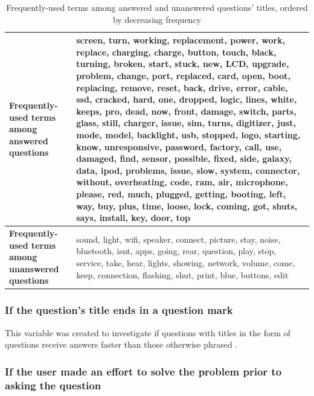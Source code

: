 \documentclass[preprint]{elsarticle}
\begin{document}
\begin{table}[!htbp]
\centering
\begin{tabular}{|L{4cm}|L{8cm}|}
  \hline
 \textbf{Frequently-used terms among answered questions} & screen, turn, working, replacement, power, work, replace, charging, charge, button, touch, black, turning, broken, start, stuck, new, LCD, upgrade, problem, change, port, replaced, card, open, boot, replacing, remove, reset, back, drive, error, cable, ssd, cracked, hard, one, dropped, logic, lines, white, keeps, pro, dead, now, front, damage, switch, parts, glass, still, charger, issue, sim, turns, digitizer, just, mode, model, backlight, usb, stopped, logo, starting, know, unresponsive, password, factory, call, use, damaged, find, sensor, possible, fixed, side, galaxy, data, ipod, problems, issue, slow, system, connector, without, overheating, code, ram, air, microphone, please, red, much, plugged, getting, booting, left, way, buy, plus, time, loose, lock, coming, got, shuts, says, install, key, door, top \\
  \hline
  \textbf{Frequently-used terms among unanswered questions} & sound, light, wifi, speaker, connect, picture, stay, noise, bluetooth, isnt, apps, going, rear, question, play, stop, service, take, hear, lights, showing, network, volume, come, keep, connection, flashing, shut, print, blue, buttons, edit \\ 
   \hline
\end{tabular}
\caption{Frequently-used terms among answered and unanswered questions' titles, ordered by decreasing frequency}
\label{table:frequentterms}
\end{table}


\subsubsection{If the question's title ends in a question mark}

This variable was created to investigate if questions with titles in the form of questions receive answers faster than those otherwise phrased \cite{Bhat2014}. 


\subsubsection{If the user made an effort to solve the problem prior to asking the question}
\end{document}
